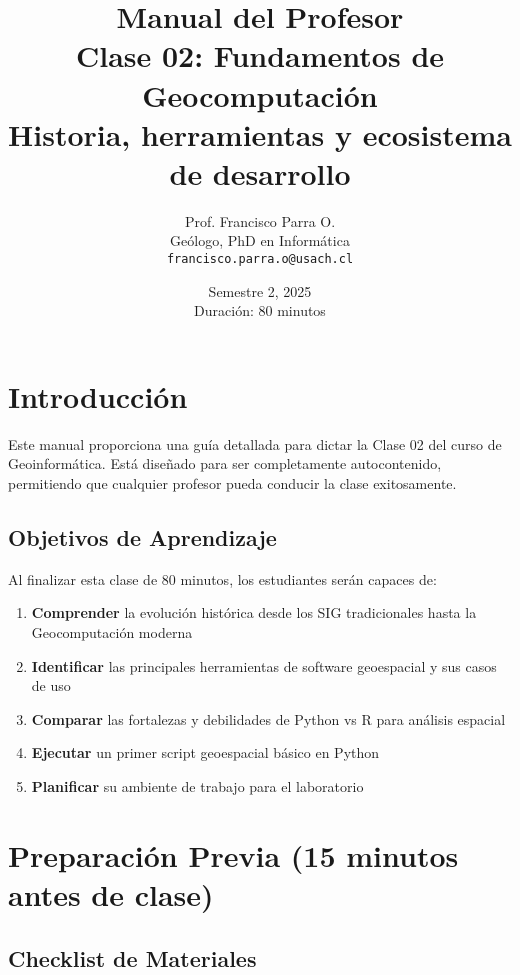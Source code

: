 \documentclass[11pt,a4paper]{article}
\title{{\Huge \textbf{Manual del Profesor}}\\[0.5cm]
{\Large Clase 02: Fundamentos de Geocomputación}\\[0.3cm]
{\large Historia, herramientas y ecosistema de desarrollo}}
\author{Prof. Francisco Parra O.\\
Geólogo, PhD en Informática\\
\texttt{francisco.parra.o@usach.cl}}
\date{Semestre 2, 2025\\
Duración: 80 minutos}
\begin{document}
\maketitle
\thispagestyle{empty}
\newpage

\tableofcontents
\newpage

\section{Introducción}

Este manual proporciona una guía detallada para dictar la Clase 02 del curso de Geoinformática. Está diseñado para ser completamente autocontenido, permitiendo que cualquier profesor pueda conducir la clase exitosamente.

\subsection{Objetivos de Aprendizaje}

Al finalizar esta clase de 80 minutos, los estudiantes serán capaces de:

\begin{enumerate}
    \item \textbf{Comprender} la evolución histórica desde los SIG tradicionales hasta la Geocomputación moderna
    \item \textbf{Identificar} las principales herramientas de software geoespacial y sus casos de uso
    \item \textbf{Comparar} las fortalezas y debilidades de Python vs R para análisis espacial
    \item \textbf{Ejecutar} un primer script geoespacial básico en Python
    \item \textbf{Planificar} su ambiente de trabajo para el laboratorio
\end{enumerate}

\section{Preparación Previa (15 minutos antes de clase)}

\subsection{Checklist de Materiales}
\end{document}
